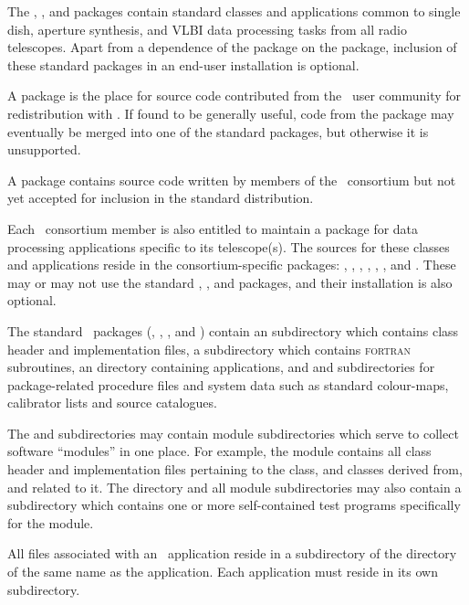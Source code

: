 The , , and  packages contain standard
classes and applications common to single dish, aperture synthesis, and VLBI
data processing tasks from all radio telescopes.  Apart from a dependence of
the  package on the  package, inclusion of these
standard packages in an end-user installation is optional.

A  package is the place for source code contributed from the
\aipspp\ user community for redistribution with \aipspp.  If found to be
generally useful, code from the  package may eventually be
merged into one of the standard packages, but otherwise it is unsupported.

A  package contains source code written by members of the
\aipspp\ consortium but not yet accepted for inclusion in the standard
distribution.

Each \aipspp\ consortium member is also entitled to maintain a package for
data processing applications specific to its telescope(s).  The sources for
these classes and applications reside in the consortium-specific packages:
, , , , , ,
and .  These may or may not use the standard ,
, and  packages, and their installation is also
optional.

The standard \aipspp\ packages (, , ,
and ) contain an  subdirectory which contains class
header and implementation files, a  subdirectory which contains
\textsc{fortran} subroutines, an  directory containing applications,
and  and  subdirectories for package-related
procedure files and system data such as standard colour-maps, calibrator lists
and source catalogues.

The  and  subdirectories may contain module
subdirectories which serve to collect software ``modules'' in one place.  For
example, the  module contains all class header and implementation
files pertaining to the  class, and classes derived from, and
related to it.  The  directory and all module subdirectories
may also contain a  subdirectory which contains one or more
self-contained test programs specifically for the module.

All files associated with an \aipspp\ application reside in a subdirectory of
the  directory of the same name as the application.  Each
application must reside in its own subdirectory.

